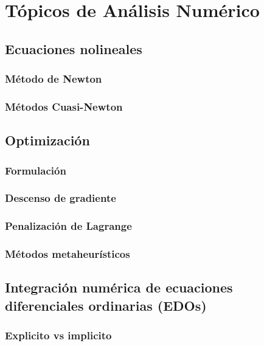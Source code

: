 \chapter{Tópicos de Análisis Numérico}\label{ch:AnalNum}

\section{Ecuaciones nolineales}

\textcite{heath2002scientificcomputing}

\subsection{Método de Newton}

\subsection{Métodos Cuasi-Newton}

\section{Optimización}

\subsection{Formulación}

\subsection{Descenso de gradiente}

\subsection{Penalización de Lagrange}

\subsection{Métodos metaheurísticos}

\section{Integración numérica de ecuaciones diferenciales ordinarias (EDOs)}

\subsection{Explicito vs implicito}

